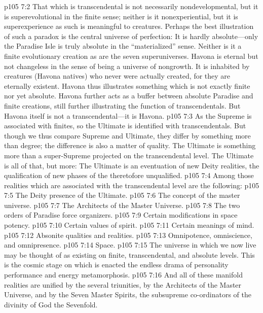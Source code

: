 \vs p105 7:2 That which is transcendental is not necessarily nondevelopmental, but it is superevolutional in the finite sense; neither is it nonexperiential, but it is superexperience as such is meaningful to creatures. Perhaps the best illustration of such a paradox is the central universe of perfection: It is hardly absolute---only the Paradise Isle is truly absolute in the “materialized” sense. Neither is it a finite evolutionary creation as are the seven superuniverses. Havona is eternal but not changeless in the sense of being a universe of nongrowth. It is inhabited by creatures (Havona natives) who never were actually created, for they are eternally existent. Havona thus illustrates something which is not exactly finite nor yet absolute. Havona further acts as a buffer between absolute Paradise and finite creations, still further illustrating the function of transcendentals. But Havona itself is not a transcendental---it is Havona.
\vs p105 7:3 As the Supreme is associated with finites, so the Ultimate is identified with transcendentals. But though we thus compare Supreme and Ultimate, they differ by something more than degree; the difference is also a matter of quality. The Ultimate is something more than a super\hyp{}Supreme projected on the transcendental level. The Ultimate is all of that, but more: The Ultimate is an eventuation of new Deity realities, the qualification of new phases of the theretofore unqualified.
\pc \vs p105 7:4 Among those realities which are associated with the transcendental level are the following:
\pc \vs p105 7:5 \bibnobreakspace The Deity presence of the Ultimate.
\vs p105 7:6 \bibnobreakspace The concept of the master universe.
\vs p105 7:7 \bibnobreakspace The Architects of the Master Universe.
\vs p105 7:8 \bibnobreakspace The two orders of Paradise force organizers.
\vs p105 7:9 \bibnobreakspace Certain modifications in space potency.
\vs p105 7:10 \bibnobreakspace Certain values of spirit.
\vs p105 7:11 \bibnobreakspace Certain meanings of mind.
\vs p105 7:12 \bibnobreakspace Absonite qualities and realities.
\vs p105 7:13 \bibnobreakspace Omnipotence, omniscience, and omnipresence.
\vs p105 7:14 \bibnobreakspace Space.
\pc \vs p105 7:15 The universe in which we now live may be thought of as existing on finite, transcendental, and absolute levels. This is the cosmic stage on which is enacted the endless drama of personality performance and energy metamorphosis.
\vs p105 7:16 And all of these manifold realities are unified  by the several triunities,  by the Architects of the Master Universe, and  by the Seven Master Spirits, the subsupreme co\hyp{}ordinators of the divinity of God the Sevenfold.
